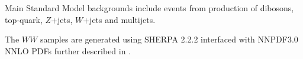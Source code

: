 %
%

Main Standard Model backgrounds include events from production of dibosons, top-quark, $Z$+jets, $W$+jets and multijets. %

The $WW$ samples are generated using \textsc{SHERPA} 2.2.2 interfaced with NNPDF3.0 NNLO PDFs further described in \cite{Cascioli:2013gfa}. 



